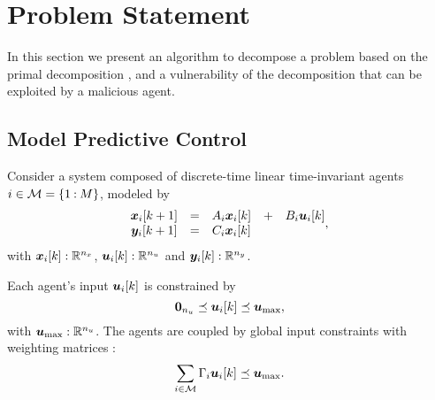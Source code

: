 \documentclass{ifacconf}  %
\begin{document}
\section{Problem Statement}\label{sec:PS}
In this section we present an algorithm to decompose a \mpc{} problem based on the primal decomposition \citep{BoydEtAl2015}, and a vulnerability of the decomposition that can be exploited by a malicious agent.

\subsection{Model Predictive Control}\label{ssec:MPC}
Consider a system composed of discrete-time linear time-invariant agents ${i\in\mathcal{M}=\{1\mathbin{:}M\}}$, modeled by
\begin{equation}
\begin{matrix}
  \label{eq:systems}
\vec{x}_{i}[k+1]&=&A_{i}\xik &+& B_{i}\uik\\
\vec{y}_{i}[k+1]&=&C_{i}\xik &&
\end{matrix},
\end{equation}
with $\boldsymbol{x}_{i}[k]:\mathbb{R}^{n_{x}}$, $\boldsymbol{u}_{i}[k]:\mathbb{R}^{n_{u}}$ and $\boldsymbol{y}_{i}[k]:\mathbb{R}^{n_{y}}$.

Each agent's input $\uik$ is constrained by
\begin{equation}
  \label{eq:u_local_constraints}
  \0_{n_{u}}\preceq\uik\preceq\vec{u}_{\max},
\end{equation}
with ${\boldsymbol{u}_{\mathrm{\max}}:\mathbb{R}^{n_{u}}}$.
The agents are coupled by global input constraints with weighting matrices :
\begin{equation}
  \label{eq:global_constraint}
  \sum_{i\in\set{M}}\Gamma_{i}\uik\preceq\umax.
\end{equation}
\end{document}
